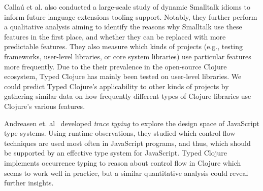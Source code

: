 \documentclass[11pt]{iuthesis}
\begin{document}
Calla{\'u} et al. \cite{Callau2013} also conducted a large-scale study of
dynamic Smalltalk idioms to inform future language extensions tooling support.
Notably, they further perform a qualitative analysis aiming to identify
the reasons why Smalltalk use these features in the first place, and
whether they can be replaced with more predictable features. They also 
measure which kinds of projects (e.g., testing frameworks, user-level libraries, or core system libraries) 
use particular features more frequently.
Due to the their prevalence in the open-source Clojure ecosystem,
Typed Clojure has mainly been tested on user-level libraries.
We could predict Typed Clojure's applicability to other kinds of projects
by gathering similar data on how frequently different types of Clojure libraries use
Clojure's various features.

Andreasen et. al~\cite{Andreasen2016TraceTA} developed
\emph{trace typing} to explore the design space of JavaScript type systems. 
Using runtime observations, they studied which control flow techniques
are used most often in JavaScript programs, and thus, which should
be supported by an effective type system for JavaScript.
Typed Clojure implements occurrence typing to reason about control
flow in Clojure which seems to work well in practice, but a similar
quantitative analysis could reveal further insights.


\end{document}
